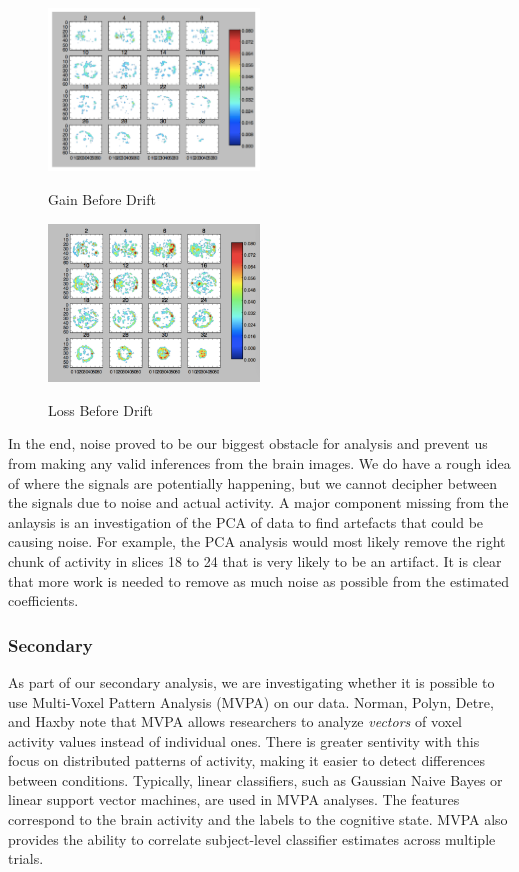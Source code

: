 \documentclass[11pt]{article}
\begin{document}
\begin{figure}[h]
\caption{Gain Before Drift}
\centering
\includegraphics[width=0.5\textwidth]{gain-before-drift.png}
\label{fig:gain-before-drift}
\end{figure}

\begin{figure}[h]
\caption{Loss Before Drift}
\centering
\includegraphics[width=0.5\textwidth]{loss-before-drift.png}
\label{fig:loss-before-drift}
\end{figure}

In the end, noise proved to be our biggest obstacle for analysis and prevent us
from making any valid inferences from the brain images. We do have a rough idea
of where the signals are potentially happening, but we cannot decipher between
the signals due to noise and actual activity. A major component missing from
the anlaysis is an investigation of the PCA of data to find artefacts that
could be causing noise. For example, the PCA analysis would most likely remove
the right chunk of activity in slices 18 to 24 that is very likely to be an
artifact. It is clear that more work is needed to remove as much noise as
possible from the estimated coefficients.

\subsubsection{Secondary}

As part of our secondary analysis, we are investigating whether it is possible
to use Multi-Voxel Pattern Analysis (MVPA) on our data. Norman, Polyn, Detre,
and Haxby note that MVPA allows researchers to analyze \textit{vectors} of
voxel activity values instead of individual ones\cite{norman}. There is greater
sentivity with this focus on distributed patterns of activity, making it easier
to detect differences between conditions\cite{bvmvpa}. Typically, linear
classifiers, such as Gaussian Naive Bayes or linear support vector machines,
are used in MVPA analyses\cite{norman}. The features correspond to the brain
activity and the labels to the cognitive state. MVPA also provides the ability
to correlate subject-level classifier estimates across multiple
trials\cite{norman}.
\end{document}
